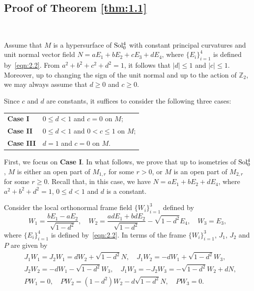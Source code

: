\documentclass[reqno]{amsart}%
\theoremstyle{definition}
\numberwithin{equation}{section}
\begin{document}
	\subsection{Proof of Theorem \texorpdfstring{\ref{thm:1.1}}{1.1}}~
	
	Assume that $M$ is a hypersurface of ${\rm Sol_0^4}$ with constant principal curvatures
	and unit normal vector field $N=aE_1+bE_2+cE_3+dE_4$, where  $\{E_i\}_{i=1}^4$ is
	defined by~\eqref{eqn:2.2}.
	From $a^2+b^2+c^2+d^2=1$, it follows that $|d|\leq1$ and $|c|\leq1$. Moreover,
	up to changing the sign of the unit normal 
	and up to the action of $\mathbb{Z}_2$,
	we may always assume that $d\geq0$ and $c\geq0$.
	
	Since $c$ and $d$ are constants, it suffices to consider the following
	three cases:
	\vspace*{1ex}
	
	\begin{tabular}{l l}
		{\bf Case I} & $0\leq d<1$ and $c=0$ on $M$; \\
		{\bf Case II} & $0\leq d<1$ and $0<c\leq1$ on $M$; \\
		{\bf Case III} & $d=1$ and $c=0$ on $M$.
	\end{tabular}
	\vspace*{1ex}
	
	First, we focus on {\bf Case I}.
	In what follows, we prove that up to isometries of ${\rm Sol_0^4}$,
	$M$ is either an open part of $M_{1,r}$ for some $r>0$, or
	$M$ is an open part of $M_{2,r}$ for some $r\geq0$.
	Recall  that, in this case, we have $N=aE_1+bE_2+dE_4$, where $a^2+b^2+d^2=1$, $0\leq d<1$
	and $d$ is a constant.
	
	Consider the
	local orthonormal frame field $\{W_i\}_{i=1}^3$ defined by
	\begin{equation}\label{eqn:2.16}
		W_1=\frac{bE_1-a E_2}{\sqrt{1-d^2}}, \quad
		W_2=\frac{adE_1+bd E_2}{\sqrt{1-d^2}}-\sqrt{1-d^2}E_4, \quad
		W_3=E_3,
	\end{equation}
	where $\{E_i\}_{i=1}^4$ is defined by~\eqref{eqn:2.2}.
	In terms of the frame $\{W_i\}_{i=1}^3$, $J_1$, $J_2$ and $P$ are given by
	\begin{equation}\label{eqn:2.20}
		\begin{aligned}
			&J_1W_1=J_2W_1=dW_2+\sqrt{1-d^2}N, \quad J_1W_2=-dW_1+\sqrt{1-d^2}W_3,\\
			&J_2W_2=-dW_1-\sqrt{1-d^2}W_3, \quad J_1W_3=-J_2W_3=-\sqrt{1-d^2}W_2+dN,\\
			& PW_1=0, \quad PW_2=(1-d^2)W_2-d\sqrt{1-d^2}N, \quad PW_3=0.
		\end{aligned}
	\end{equation}
	
\end{document}
